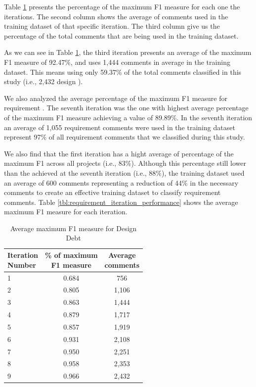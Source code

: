 Table \ref{tbl:design_iteration_performance} presents the percentage of the maximum F1 measure for each one the iterations. The second column shows the average of comments used in the training dataset of that specific iteration. The third column give us the percentage of the total comments that are being used in the training dataset. 

As we can see in Table \ref{tbl:design_iteration_performance}, the third iteration presents an average of the maximum F1 measure of 92.47\%, and uses 1,444 comments in average in the training dataset. This means using only 59.37\% of the total comments classified in this study (i.e., 2,432 design \SATD). 

We also analyzed the average percentage of the maximum F1 measure for requirement \SATD. The seventh iteration was the one with highest average percentage of the maximum F1 measure achieving a value of 89.89\%. In the seventh iteration an average of 1,055 requirement \SATD comments were used in the training dataset represent 97\% of all requirement \SATD comments that we classified during this study.

We also find that the first iteration has a hight average of percentage of the maximum F1 across all projects (i.e., 83\%). Although this percentage still lower than the achieved at the seventh iteration (i.e., 88\%), the training dataset used an average of 600 \SATD comments representing a reduction of 44\% in the necessary comments to create an effective training dataset to classify requirement \SATD comments. Table \ref{tbl:requirement_iteration_performance} shows the average maximum F1 measure for each iteration. 

\begin{table}[!hbt]
    \begin{center}
        \caption{Average maximum F1 measure for Design Debt}
        \label{tbl:design_iteration_performance}
        \begin{tabular}{l| c c }
        \toprule
        \thead{Iteration\\Number} & \thead{\% of maximum\\F1 measure} & \thead{Average\\comments} \\
        \midrule
         1  &  0.684  & 756   \\  
         2  &  0.805  & 1,106 \\  
         3  &  0.863  & 1,444 \\  
         4  &  0.879  & 1,717 \\  
         5  &  0.857  & 1,919 \\  
         6  &  0.931  & 2,108 \\  
         7  &  0.950  & 2,251 \\  
         8  &  0.958  & 2,353 \\  
         9  &  0.966  & 2,432 \\  
        \bottomrule
        \end{tabular}
    \end{center}    
\end{table}

